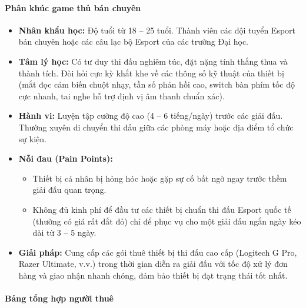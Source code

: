 \paragraph{Phân khúc game thủ bán chuyên}
\begin{itemize}
    \item \textbf{Nhân khẩu học:} Độ tuổi từ 18 -- 25 tuổi. Thành viên các đội tuyển Esport bán chuyên hoặc các câu lạc bộ Esport của các trường Đại học.
    \item \textbf{Tâm lý học:} Có tư duy thi đấu nghiêm túc, đặt nặng tính thắng thua và thành tích. Đòi hỏi cực kỳ khắt khe về các thông số kỹ thuật của thiết bị (mắt đọc cảm biến chuột nhạy, tần số phản hồi cao, switch bàn phím tốc độ cực nhanh, tai nghe hỗ trợ định vị âm thanh chuẩn xác).
    \item \textbf{Hành vi:} Luyện tập cường độ cao (4 -- 6 tiếng/ngày) trước các giải đấu. Thường xuyên di chuyển thi đấu giữa các phòng máy hoặc địa điểm tổ chức sự kiện.
    \item \textbf{Nỗi đau (Pain Points):}
    \begin{itemize}
        \item Thiết bị cá nhân bị hỏng hóc hoặc gặp sự cố bất ngờ ngay trước thềm giải đấu quan trọng.
        \item Không đủ kinh phí để đầu tư các thiết bị chuẩn thi đấu Esport quốc tế (thường có giá rất đắt đỏ) chỉ để phục vụ cho một giải đấu ngắn ngày kéo dài từ 3 -- 5 ngày.
    \end{itemize}
    \item \textbf{Giải pháp:} Cung cấp các gói thuê thiết bị thi đấu cao cấp (Logitech G Pro, Razer Ultimate, v.v.) trong thời gian diễn ra giải đấu với tốc độ xử lý đơn hàng và giao nhận nhanh chóng, đảm bảo thiết bị đạt trạng thái tốt nhất.
\end{itemize}

\paragraph{Bảng tổng hợp người thuê}

